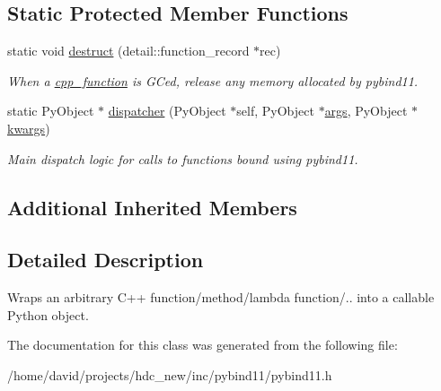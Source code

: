 \subsection*{Static Protected Member Functions}
\begin{DoxyCompactItemize}
\item 
static void \hyperlink{classcpp__function_a61bdafab94b0fa0bad23c5161e7f9e59}{destruct} (detail\+::function\+\_\+record $\ast$rec)\hypertarget{classcpp__function_a61bdafab94b0fa0bad23c5161e7f9e59}{}\label{classcpp__function_a61bdafab94b0fa0bad23c5161e7f9e59}

\begin{DoxyCompactList}\small\item\em When a \hyperlink{classcpp__function}{cpp\+\_\+function} is G\+Ced, release any memory allocated by pybind11. \end{DoxyCompactList}\item 
static Py\+Object $\ast$ \hyperlink{classcpp__function_a1a83e55fec8447da29d5c52547ac233d}{dispatcher} (Py\+Object $\ast$self, Py\+Object $\ast$\hyperlink{classargs}{args}, Py\+Object $\ast$\hyperlink{classkwargs}{kwargs})\hypertarget{classcpp__function_a1a83e55fec8447da29d5c52547ac233d}{}\label{classcpp__function_a1a83e55fec8447da29d5c52547ac233d}

\begin{DoxyCompactList}\small\item\em Main dispatch logic for calls to functions bound using pybind11. \end{DoxyCompactList}\end{DoxyCompactItemize}
\subsection*{Additional Inherited Members}


\subsection{Detailed Description}
Wraps an arbitrary C++ function/method/lambda function/.. into a callable Python object. 

The documentation for this class was generated from the following file\+:\begin{DoxyCompactItemize}
\item 
/home/david/projects/hdc\+\_\+new/inc/pybind11/pybind11.\+h\end{DoxyCompactItemize}
